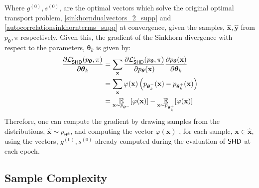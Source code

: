 \noindent Where $g^{(0)}, s^{(0)}$, are the optimal vectors which solve the original optimal transport problem, \eqref{sinkhorndualvectors_2_supp} and \eqref{autocorrelationsinkhornterms_supp} at convergence, given the samples, $\hat{\mathbf{x}}, \hat{\mathbf{y}}$ from $p_{\boldsymbol\theta}, \pi$ respectively.
Given this, the gradient of the Sinkhorn divergence with respect to the parameters, ${\boldsymbol\theta}_k$ is given by:
\begin{align}
    \frac{\partial \mathcal{L}_{\operatorname{\textsf{SHD}}}^\epsilon(p_{\boldsymbol\theta}, \pi)}{\partial {\boldsymbol\theta}_k} &= \sum\limits_{\mathbf{x}}\frac{\partial \mathcal{L}_{\operatorname{\textsf{SHD}}}^\epsilon(p_{\boldsymbol\theta}, \pi)}{\partial p_{\boldsymbol\theta}(\mathbf{x})}\frac{\partial p_{\boldsymbol\theta}(\mathbf{x})}{\partial {\boldsymbol\theta}_k} \nonumber\\
    & = \sum\limits_\mathbf{x}\varphi(\mathbf{x})\left(p_{{\boldsymbol\theta}^-_k}(\mathbf{x}) - p_{{\boldsymbol\theta}^+_k}(\mathbf{x})\right) \nonumber \\
    & = \underset{\substack{\mathbf{x} \sim p_{{\boldsymbol\theta}^-} }}{\mathbb{E}}[\varphi(\mathbf{x})] 
    -\underset{\substack{\mathbf{x} \sim p_{{\boldsymbol\theta}_k^+}  }}{\mathbb{E}}[\varphi(\mathbf{x})] \label{sinkhorngradient_supp}
\end{align}
 Therefore, one can compute the gradient by drawing samples from the distributions, $\hat{\mathbf{x}} \sim p_{{\boldsymbol\theta}^\pm}$, and computing the vector $\varphi(\mathbf{x})$ , for each sample, $\mathbf{x} \in \hat{\mathbf{x}}$, using the vectors, $g^{(0)}, s^{(0)}$ already computed during the evaluation of $\operatorname{\textsf{SHD}}$ at each epoch.

\subsection{Sample Complexity} \label{supp_matt:sinkhorn_sample_complexity}

